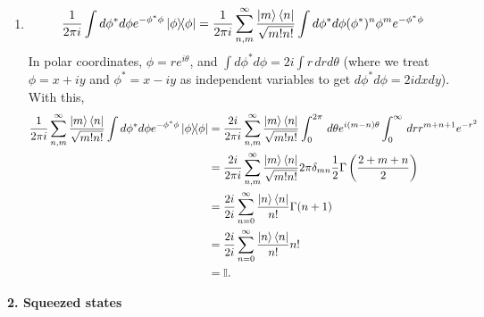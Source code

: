 \documentclass{article}
\theoremstyle{definition}
\newcommand{\f}[2]{\frac{#1}{#2}}
\newcommand{\lp}{\left(}
\newcommand{\rp}{\right)}
\begin{document}
\begin{enumerate}[label=(\alph*)]
	\item 
	\begin{align*}
	\f{1}{2\pi i}\int d\phi^* d\phi e^{-\phi^*\phi}\ketbra{\phi} = 
	\f{1}{2\pi i} \sum^\infty_{n,m} \f{\ket{m}\bra{n}}{\sqrt{m!n!}} 
	\int d\phi^* d\phi  (\phi^*)^n \phi^m e^{-\phi^*\phi}
	\end{align*}
	In polar coordinates, $\phi =re^{i\theta}$, and $\int d\phi^* d\phi = 2i\int r\,drd\theta$ (where we treat $\phi = x + iy$ and $\phi^* = x - iy$ as independent variables to get $d\phi^* d\phi = 2i dxdy$). With this, 
	\begin{align*}
	\f{1}{2\pi i}\sum^\infty_{n,m} \f{\ket{m}\bra{n}}{\sqrt{m!n!}} \int d\phi^* d\phi e^{-\phi^*\phi}\ketbra{\phi} 
	&= \f{2i}{2\pi i}\sum^\infty_{n,m} \f{\ket{m}\bra{n}}{\sqrt{m!n!}} \int^{2\pi}_0 \,d\theta e^{i(m-n)\theta} \int_0^\infty \,dr r^{m+n+1} e^{-r^2}\\
	&= \f{2i}{2\pi i}\sum^\infty_{n,m} \f{\ket{m}\bra{n}}{\sqrt{m!n!}} 2\pi \delta_{mn} \f{1}{2}\Gamma\lp  \f{2+m+n}{2}\rp\\
	&= \f{2i}{2i} \sum^\infty_{n=0} \f{\ket{n}\bra{n}}{n!} \Gamma(n+1)\\
	&= \f{2i}{2i} \sum^\infty_{n=0} \f{\ket{n}\bra{n}}{n!} n!\\
	&= \mathbb{I}.
	\end{align*}
\end{enumerate}



\noindent \textbf{2. Squeezed states}
\end{document}
